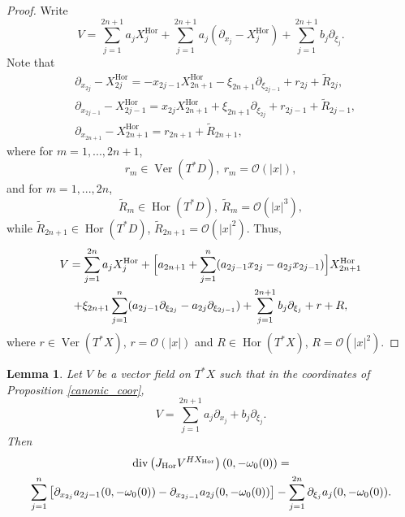 \documentclass{article}
\newtheorem{lemma}[theorem]{Lemma}
\newcommand{\mco}{\mathcal O}
\DeclareMathOperator{\Div}{div}
\DeclareMathOperator{\Hor}{Hor}
\DeclareMathOperator{\Ver}{Ver}
\begin{document}
%
\begin{proof}
Write $$V = \sum_{j=1}^{2n+1} a_j X_j^{\Hor} + \sum_{j=1}^{2n+1}a_j (\partial_{x_j} - X_j^{\Hor}) + \sum_{j=1}^{2n+1} b_j \partial_{\xi_j}.$$
Note that 
%
$$\begin{aligned}&\partial_{x_{2j}} - X_{2j}^{\Hor} = - x_{2j-1} X_{2n+1}^{\Hor} - \xi_{2n+1} \partial_{\xi_{2j-1}} + r_{2j} + \tilde R_{2j},\\ &\partial_{x_{2j-1}} - X_{2j-1}^{\Hor} = x_{2j} X_{2n+1}^{\Hor} + \xi_{2n+1} \partial_{\xi_{2j}} +r_{2j-1} + \tilde R_{2j-1},\\ &\partial_{x_{2n+1}} - X_{2n+1}^{\Hor} = r_{2n+1} +\tilde R_{2n+1}, \end{aligned}$$
where for $m = 1,...,2n+1$, $$r_m \in \Ver(T^*D),\ r_m = \mco(|x|),$$
and for $m = 1,...,2n$, $$\tilde R_m  \in \Hor(T^*D),\ \tilde R_m = \mco(|x|^3),$$
while $\tilde R_{2n+1} \in \Hor(T^*D)$, $\tilde R_{2n+1} = \mco(|x|^2)$. Thus, \begin{multline}\label{V_decomp} V = \sum_{j=1}^{2n} a_j X_j^{\Hor} + \Big{[} a_{2n+1} + \sum_{j=1}^n (a_{2j-1} x_{2j} - a_{2j} x_{2j-1}) \Big{]} X_{2n+1}^{\Hor} \\ + \xi_{2n+1} \sum_{j=1}^n (a_{2j-1} \partial_{\xi_{2j}} - a_{2j} \partial_{\xi_{2j-1}} ) + \sum_{j=1}^{2n+1} b_j \partial_{\xi_j} + r + R,\end{multline}
where $r \in \Ver(T^*X)$, $r = \mco(|x|)$ and $R \in \Hor(T^*X)$, $R = \mco(|x|^2)$.
\end{proof}
%
\begin{lemma}Let $V$ be a vector field on $T^*X$ such that in the coordinates of Proposition \ref{canonic_coor},$$V = \sum_{j=1}^{2n+1} a_j \partial_{x_j} + b_j \partial_{\xi_j}.$$ Then \begin{multline*}\Div\left(J_{\Hor} V^{HX_{\Hor}}\right)(0, -\omega_0(0)) =\\ \sum_{j=1}^n \big{[}\partial_{x_{2j}} a_{2j-1}(0, -\omega_0(0)) - \partial_{x_{2j-1}} a_{2j}(0,-\omega_0(0))\big{]} - \sum_{j=1}^{2n} \partial_{\xi_j} a_j(0, -\omega_0(0)).\end{multline*}\end{lemma}
%
\end{document}
